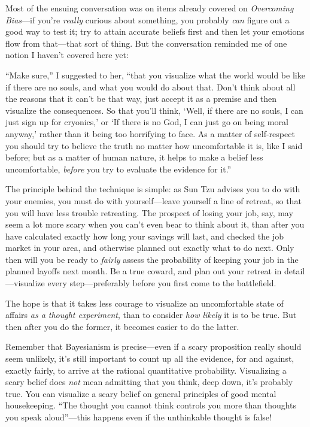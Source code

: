 {
 Most of the ensuing conversation was on items already covered on
\textit{Overcoming Bias}{}---if you're \textit{really}
curious about something, you probably \textit{can} figure out a good
way to test it; try to attain accurate beliefs first and then let your
emotions flow from that---that sort of thing. But the conversation
reminded me of one notion I haven't covered here yet:}

{
 ``Make sure,'' I suggested to
her, ``that you visualize what the world would be like
if there are no souls, and what you would do about that.
Don't think about all the reasons that it
can't be that way, just accept it as a premise and then
visualize the consequences. So that you'll think,
`Well, if there are no souls, I can just sign up for
cryonics,' or `If there is no God, I can
just go on being moral anyway,' rather than it being
too horrifying to face. As a matter of self-respect you should try to
believe the truth no matter how uncomfortable it is, like I said
before; but as a matter of human nature, it helps to make a belief less
uncomfortable, \textit{before} you try to evaluate the evidence for
it.''}

{
 The principle behind the technique is simple: as Sun Tzu advises
you to do with your enemies, you must do with yourself---leave yourself
a line of retreat, so that you will have less trouble retreating. The
prospect of losing your job, say, may seem a lot more scary when you
can't even bear to think about it, than after you have
calculated exactly how long your savings will last, and checked the job
market in your area, and otherwise planned out exactly what to do next.
Only then will you be ready to \textit{fairly} assess the probability
of keeping your job in the planned layoffs next month. Be a true
coward, and plan out your retreat in detail---visualize every
step---preferably before you first come to the battlefield.}

{
 The hope is that it takes less courage to visualize an
uncomfortable state of affairs \textit{as a thought experiment}, than
to consider \textit{how likely} it is to be true. But then after you do
the former, it becomes easier to do the latter.}

{
 Remember that Bayesianism is precise---even if a scary proposition
really should seem unlikely, it's still important to
count up all the evidence, for and against, exactly fairly, to arrive
at the rational quantitative probability. Visualizing a scary belief
does \textit{not} mean admitting that you think, deep down,
it's probably true. You can visualize a scary belief on
general principles of good mental housekeeping. ``The
thought you cannot think controls you more than thoughts you speak
aloud''---this happens even if the unthinkable
thought is false!}

